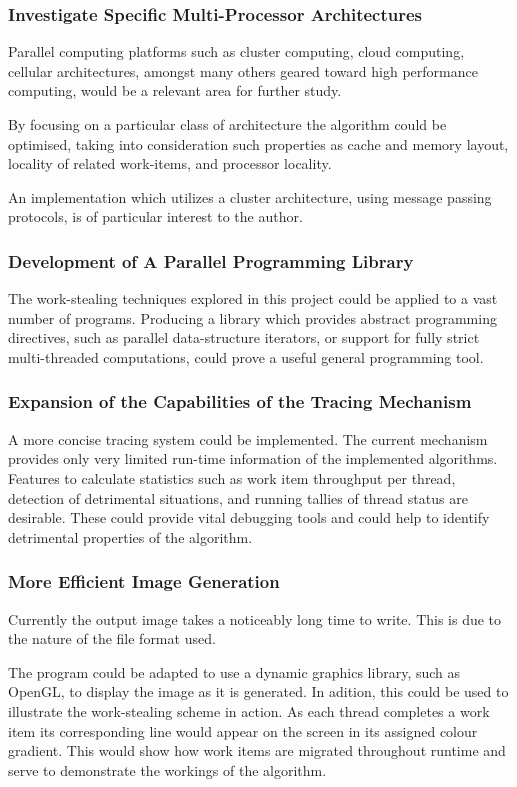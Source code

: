 \subsubsection*{Investigate Specific Multi-Processor Architectures}
Parallel computing platforms such as cluster computing, cloud computing, cellular architectures, amongst many others 
geared toward high performance computing, would be a relevant  area for further study. 

By focusing on a particular class of architecture the algorithm could be optimised, taking into consideration such 
properties as cache and memory layout, locality of related work-items, and processor locality. 

An implementation which utilizes a cluster architecture, using message passing protocols, is of particular interest
to the author.

\subsubsection*{Development of A Parallel Programming Library}
The work-stealing techniques explored in this project could be applied to a vast number of programs. 
Producing a library which provides abstract programming directives, such as parallel data-structure iterators, or
support for fully strict multi-threaded computations, could prove a useful general programming tool. 

\subsubsection*{Expansion of the Capabilities of the Tracing Mechanism}
A more concise tracing system could be implemented. The current mechanism provides only very limited run-time information
of the implemented algorithms. 
Features to calculate statistics such as work item throughput per thread, detection of detrimental situations, and running 
tallies of thread status are desirable. These could provide vital debugging tools and could help to identify detrimental 
properties of the algorithm.

\subsubsection*{More Efficient Image Generation}
Currently the output image takes a noticeably long time to write. This is due to the nature of the file format used.

The program could be adapted to use a dynamic graphics library, such as OpenGL, to display the image as it is generated.
In adition, this could be used to illustrate the work-stealing scheme in action. As each thread completes a work item its corresponding
line would appear on the screen in its assigned colour gradient. This would show how work items are migrated throughout runtime and serve
to demonstrate the workings of the algorithm.

